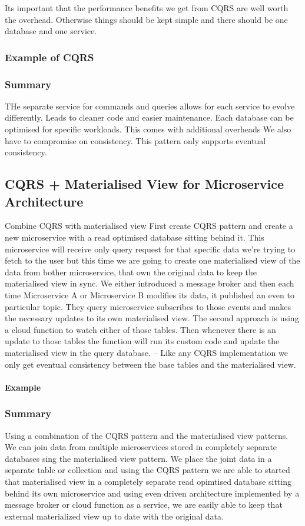 Its important that the performance benefits we get from CQRS are well worth the overhead.
Otherwise things should be kept simple and there should be one database and one service.

\subsubsection{Example of CQRS}

\subsubsection{Summary}
THe separate service for commands and queries allows for each service to evolve differently.
Leads to cleaner code and easier maintenance.
Each database can be optimised for specific workloads.
This comes with additional overheads
We also have to compromise on consistency.
This pattern only supports eventual consistency.

\subsection{CQRS + Materialised View for Microservice Architecture}
Combine CQRS with materialised view
First create CQRS pattern and create a new microservice with a read optimised database sitting behind it.
This microservice will receive only query request for that specific data we're trying to fetch to the user but this time we are going to create one materialised view of the data from bother microservice, that own the original data to keep the materialised view in sync.
We either introduced a message broker and then each time Microservice A or Microservice B modifies its data, it published an even to particular topic.
They query microservice subscribes to those events and makes the necessary updates to its own materialised view.
The second approach is using a cloud function to watch either of those tables.
Then whenever there is an update to those tables the function will run its custom code and update the materialised view in the query database.
-- Like any CQRS implementation we only get eventual consistency between the base tables and the materialised view.

\paragraph{Example}

\subsubsection{Summary}
Using a combination of the CQRS pattern and the materialised view patterns.
We can join data from multiple microservices stored in completely separate databases sing the materialised view pattern.
We place the joint data in a separate table or collection and using the CQRS pattern we are able to started that materialised view in a completely separate read opimtised database sitting behind its own microservice and using even driven architecture implemented by a message broker or cloud function as a service, we are easily able to keep that external materialized view up to date with the original data.

